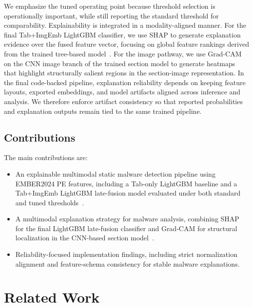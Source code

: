 \documentclass[conference]{IEEEtran}
\begin{document}


We emphasize the tuned operating point because threshold selection is operationally important, while still reporting the standard threshold for comparability. Explainability is integrated in a modality-aligned manner.
For the final Tab+ImgEmb LightGBM classifier, we use SHAP to generate explanation evidence over the fused feature vector, focusing on global feature rankings derived from the trained tree-based model~\cite{LL2017}.
For the image pathway, we use Grad-CAM~\cite{SCDVPB2017} on the CNN image branch of the trained section model to generate heatmaps that highlight structurally salient regions in the section-image representation.
In the final code-backed pipeline, explanation reliability depends on keeping feature layouts, exported embeddings, and model artifacts aligned across inference and analysis.
We therefore enforce artifact consistency so that reported probabilities and explanation outputs remain tied to the same trained pipeline.

\subsection{Contributions}

The main contributions are:
%
\begin{itemize}
\item An explainable multimodal static malware detection pipeline using EMBER2024 PE features, including a Tab-only LightGBM baseline and a Tab+ImgEmb LightGBM late-fusion model evaluated under both standard and tuned thresholds~\cite{JMGPR2024}.
\item A multimodal explanation strategy for malware analysis, combining SHAP for the final LightGBM late-fusion classifier and Grad-CAM for structural localization in the CNN-based section model~\cite{SCDVPB2017,LL2017}.
\item Reliability-focused implementation findings, including strict normalization alignment and feature-schema consistency for stable malware explanations.
\end{itemize}

\section{Related Work}
\label{section:literature-review}
\end{document}
